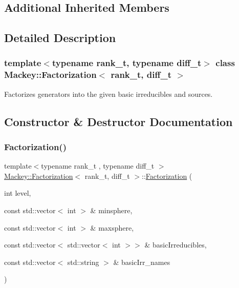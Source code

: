 \subsection*{Additional Inherited Members}


\subsection{Detailed Description}
\subsubsection*{template$<$typename rank\+\_\+t, typename diff\+\_\+t$>$\newline
class Mackey\+::\+Factorization$<$ rank\+\_\+t, diff\+\_\+t $>$}

Factorizes generators into the given basic irreducibles and sources. 

\subsection{Constructor \& Destructor Documentation}
\mbox{\label{classMackey_1_1Factorization_af1b07ab5021c4e51698c4cd3fbb85422}} 
\subsubsection{\texorpdfstring{Factorization()}{Factorization()}\hspace{0.1cm}{\footnotesize\ttfamily [1/2]}}
{\footnotesize\ttfamily template$<$typename rank\+\_\+t , typename diff\+\_\+t $>$ \\
\hyperlink{classMackey_1_1Factorization}{Mackey\+::\+Factorization}$<$ rank\+\_\+t, diff\+\_\+t $>$\+::\hyperlink{classMackey_1_1Factorization}{Factorization} (\begin{DoxyParamCaption}\item[{int}]{level,  }\item[{const std\+::vector$<$ int $>$ \&}]{minsphere,  }\item[{const std\+::vector$<$ int $>$ \&}]{maxsphere,  }\item[{const std\+::vector$<$ std\+::vector$<$ int $>$$>$ \&}]{basic\+Irreducibles,  }\item[{const std\+::vector$<$ std\+::string $>$ \&}]{basic\+Irr\+\_\+names }\end{DoxyParamCaption})}



